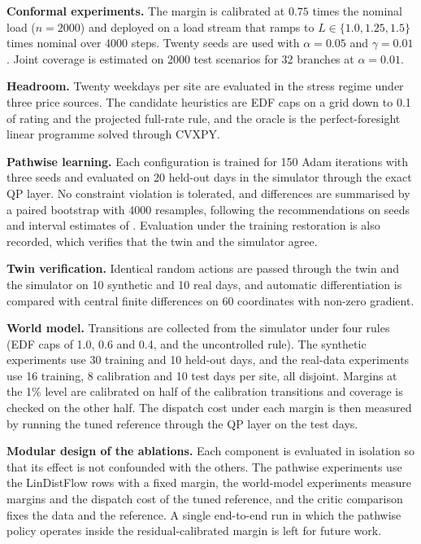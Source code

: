 \documentclass[11pt]{article}
\begin{document}
\textbf{Conformal experiments.} The margin is calibrated at $0.75$ times the nominal load ($n=2000$) and deployed on a load stream that ramps to $L\in\{1.0,1.25,1.5\}$ times nominal over 4000 steps. Twenty seeds are used with $\alpha=0.05$ and $\gamma=0.01$. Joint coverage is estimated on 2000 test scenarios for 32 branches at $\alpha=0.01$.

\textbf{Headroom.} Twenty weekdays per site are evaluated in the stress regime under three price sources. The candidate heuristics are EDF caps on a grid down to 0.1 of rating and the projected full-rate rule, and the oracle is the perfect-foresight linear programme solved through CVXPY.

\textbf{Pathwise learning.} Each configuration is trained for 150 Adam iterations with three seeds and evaluated on 20 held-out days in the simulator through the exact QP layer. No constraint violation is tolerated, and differences are summarised by a paired bootstrap with 4000 resamples, following the recommendations on seeds and interval estimates of \cite{henderson,agarwal}. Evaluation under the training restoration is also recorded, which verifies that the twin and the simulator agree.

\textbf{Twin verification.} Identical random actions are passed through the twin and the simulator on 10 synthetic and 10 real days, and automatic differentiation is compared with central finite differences on 60 coordinates with non-zero gradient.

\textbf{World model.} Transitions are collected from the simulator under four rules (EDF caps of 1.0, 0.6 and 0.4, and the uncontrolled rule). The synthetic experiments use 30 training and 10 held-out days, and the real-data experiments use 16 training, 8 calibration and 10 test days per site, all disjoint. Margins at the 1\% level are calibrated on half of the calibration transitions and coverage is checked on the other half. The dispatch cost under each margin is then measured by running the tuned reference through the QP layer on the test days.

\textbf{Modular design of the ablations.} Each component is evaluated in isolation so that its effect is not confounded with the others. The pathwise experiments use the LinDistFlow rows with a fixed margin, the world-model experiments measure margins and the dispatch cost of the tuned reference, and the critic comparison fixes the data and the reference. A single end-to-end run in which the pathwise policy operates inside the residual-calibrated margin is left for future work.
\end{document}

